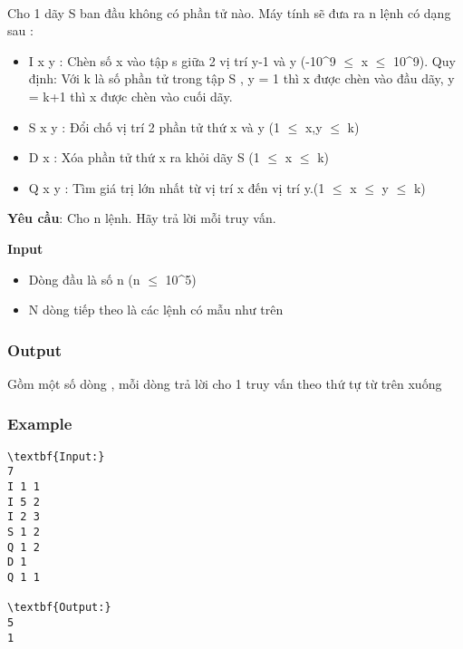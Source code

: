 

 

Cho 1 dãy S ban đầu không có phần tử nào. Máy tính sẽ đưa ra n lệnh có dạng sau :
\begin{itemize}
	\item I x y : Chèn số x vào tập s giữa 2 vị trí y-1 và y (-10\textasciicircum9  $\le$  x  $\le$  10\textasciicircum9). Quy định: Với k là số phần tử trong tập S , y = 1 thì x được chèn vào đầu dãy, y = k+1 thì x được chèn vào cuối dãy.
	\item S x y : Đổi chố vị trí 2 phần tử thứ x và y (1 $\le$  x,y  $\le$  k)
	\item D x : Xóa phần tử thứ x ra khỏi dãy S (1 $\le$ x $\le$ k)
	\item Q x y : Tìm giá trị lớn nhất từ vị trí x đến vị trí y.(1 $\le$ x $\le$ y $\le$ k)
\end{itemize}

\textbf{Yêu cầu}: Cho n lệnh. Hãy trả lời mỗi truy vấn.

\textbf{Input}
\begin{itemize}
	\item Dòng đầu là số n (n  $\le$  10\textasciicircum5)
	\item N dòng tiếp theo là các lệnh có mẫu như trên
\end{itemize}

\subsubsection{Output}

Gồm một số dòng , mỗi dòng trả lời cho 1 truy vấn theo thứ tự từ trên xuống

\subsubsection{Example}
\begin{verbatim}
\textbf{Input:}
7
I 1 1
I 5 2
I 2 3
S 1 2
Q 1 2
D 1
Q 1 1

\textbf{Output:}
5
1\end{verbatim}
